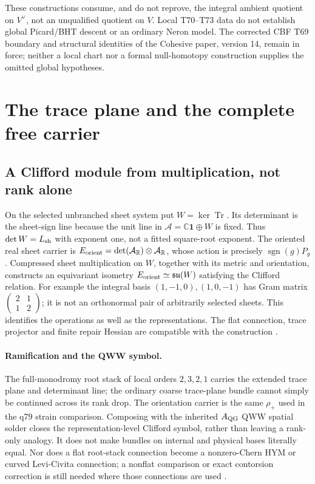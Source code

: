 \documentclass[11pt]{article}
\begin{document}
These constructions consume, and do not reprove, the integral ambient quotient
on $V^\vee$, not an unqualified quotient on $V$. Local T70--T73 data do not
establish global Picard/BHT descent or an ordinary Neron model. The corrected
CBF T69 boundary and structural identities of the Cohesive paper, version
14, remain in force; neither a local chart nor a formal null-homotopy
construction supplies the omitted global hypotheses.

\section{The trace plane and the complete free carrier}
\label{sec:root-continuation}

\subsection{A Clifford module from multiplication, not rank alone}
\label{sec:fsb04a}
On the selected unbranched sheet system put $W=\ker\operatorname{Tr}$.
Its determinant is the sheet-sign line because the unit line in
$\mathcal A=\mathbb C\mathbf1\oplus W$ is fixed. Thus
$\det W=L_{\rm sh}$ with exponent one, not a fitted square-root exponent.
The oriented real sheet carrier is
$E_{\rm orient}=\det(\mathcal A_{\mathbb R})\otimes\mathcal A_{\mathbb R}$,
whose action is precisely $\operatorname{sgn}(g)P_g$.
Compressed sheet multiplication on $W$, together with its metric and
orientation, constructs an equivariant isometry
$E_{\rm orient}\simeq\mathfrak{su}(W)$ satisfying the Clifford relation.
For example the integral basis $(1,-1,0),(1,0,-1)$ has Gram matrix
$\left(\begin{smallmatrix}2&1\\1&2\end{smallmatrix}\right)$; it is not an
orthonormal pair of arbitrarily selected sheets. This identifies the
operations as well as the representations. The flat connection, trace
projector and finite repair Hessian are compatible with the construction
\cite{FSB04a}.

\paragraph{Ramification and the QWW symbol.}\label{sec:fsb04b}
The full-monodromy root stack of local orders $2,3,2,1$ carries the extended
trace plane and determinant line; the ordinary coarse trace-plane bundle
cannot simply be continued across its rank drop. The orientation carrier is
the same $\rho_+$ used in the q79 strain comparison. Composing with the
inherited $A_{\rm QG}$ QWW spatial solder closes the representation-level
Clifford symbol, rather than leaving a rank-only analogy. It does not make
bundles on internal and physical bases literally equal. Nor does a flat
root-stack connection become a nonzero-Chern HYM or curved Levi-Civita
connection; a nonflat comparison or exact contorsion correction is still
needed where those connections are used \cite{FSB04b}.
\end{document}

